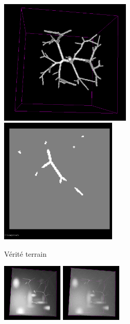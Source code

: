 \begin{figure}
\captionsetup[subfigure]{justification=centering}
\begin{subfigure}{\textwidth}
  \centering
  \includegraphics[height=6cm]{Images/gen_vascu_V2_GT.png}
  \includegraphics[height=6cm]{Images/gen_vascu_V2_GT_2D.png}
  \caption{Vérité terrain}
\end{subfigure}
\begin{subfigure}{\textwidth}
  \includegraphics[width=0.32\textwidth]{Images/gen_vascu_V2_r2.png}
  \includegraphics[width=0.32\textwidth]{Images/gen_vascu_V2_r4.png}

\end{subfigure}
\end{figure}
